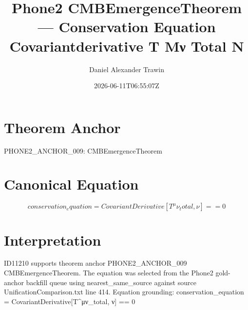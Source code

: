 \documentclass[11pt]{article}
\title{Phone2 CMBEmergenceTheorem — Conservation Equation Covariantderivative T Μν Total Ν}
\author{Daniel Alexander Trawin}
\date{2026-06-11T06:55:07Z}
\begin{document}
\maketitle
\section*{Theorem Anchor}
PHONE2_ANCHOR_009: CMBEmergenceTheorem
\section*{Canonical Equation}
\[
conservation_equation = CovariantDerivative[T^μν_total, ν] == 0
\]
\section*{Interpretation}
ID11210 supports theorem anchor PHONE2_ANCHOR_009 CMBEmergenceTheorem. The equation was selected from the Phone2 gold-anchor backfill queue using nearest_same_source against source UnificationComparison.txt line 414. Equation grounding: conservation_equation = CovariantDerivative[T^μν_total, ν] == 0
\end{document}
